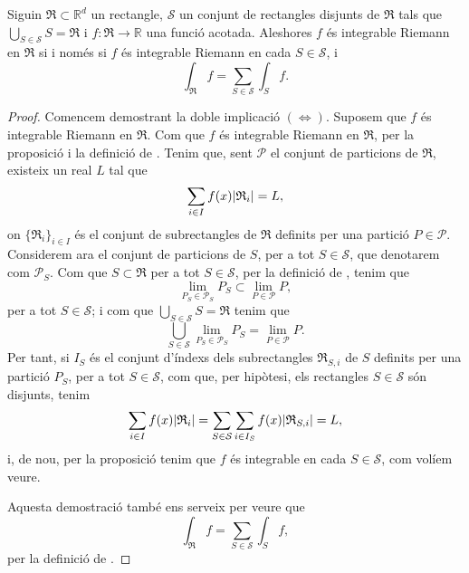 \documentclass[../Apunts.tex]{subfiles}
\begin{document}
	\begin{theorem}
		Siguin \({{\mathfrak{R}}}\subset\mathbb{R}^{d}\) un rectangle, \(\mathcal{S}\) un conjunt de rectangles disjunts de \(\mathfrak{R}\) tals que \(\bigcup_{S\in\mathcal{S}}S=\mathfrak{R}\) i \(f\colon\mathfrak{R}\to\mathbb{R}\) una funció acotada. Aleshores \(f\) és integrable Riemann en \(\mathfrak{R}\) si i només si \(f\) és integrable Riemann en cada \(S\in\mathcal{S}\), i
		\[\int_{\mathfrak{R}}f=\sum_{S\in\mathcal{S}}\int_{S}f.\]
		\begin{proof}
			Comencem demostrant la doble implicació \((\Leftrightarrow)\). Suposem que \(f\) és integrable Riemann en \(\mathfrak{R}\). Com que \(f\) és integrable Riemann en \(\mathfrak{R}\), per la proposició  i la definició de . Tenim que, sent \(\mathcal{P}\) el conjunt de particions de \(\mathfrak{R}\), existeix un real \(L\) tal que
			\[\sum_{i\in I}f(x)\abs{\mathfrak{R}_{i}}=L,\]
			on \(\{\mathfrak{R}_{i}\}_{i\in I}\) és el conjunt de subrectangles de \(\mathfrak{R}\) definits per una partició \(P\in\mathcal{P}\). Considerem ara el conjunt de particions de \(S\), per a tot \(S\in\mathcal{S}\), que denotarem com \(\mathcal{P}_{S}\). Com que \(S\subset \mathfrak{R}\) per a tot \(S\in\mathcal{S}\), per la definició de , tenim que
			\[\lim_{P_{S}\in\mathcal{P}_{S}}P_{S}\subset\lim_{P\in\mathcal{P}}P,\]
			per a tot \(S\in\mathcal{S}\); i com que \(\bigcup_{S\in\mathcal{S}}S=\mathfrak{R}\) tenim que
			\[\bigcup_{S\in\mathcal{S}}\lim_{P_{S}\in\mathcal{P}_{S}}P_{S}=\lim_{P\in\mathcal{P}}P.\]
			Per tant, si \(I_{S}\) és el conjunt d'índexs dels subrectangles \(\mathfrak{R}_{S,i}\) de \(S\) definits per una partició \(P_{S}\), per a tot \(S\in\mathcal{S}\), com que, per hipòtesi, els rectangles \(S\in\mathcal{S}\) són disjunts, tenim
			\[\sum_{i\in I}f(x)\abs{\mathfrak{R}_{i}}=\sum_{S\in\mathcal{S}}\sum_{i\in I_{S}}f(x)\abs{\mathfrak{R}_{S,i}}=L,\]
			i, de nou, per la proposició  tenim que \(f\) és integrable en cada \(S\in\mathcal{S}\), com volíem veure.
			
			Aquesta demostració també ens serveix per veure que
			\[\int_{\mathfrak{R}}f=\sum_{S\in\mathcal{S}}\int_{S}f,\]
			per la definició de . %
		\end{proof}
	\end{theorem}
\end{document}

